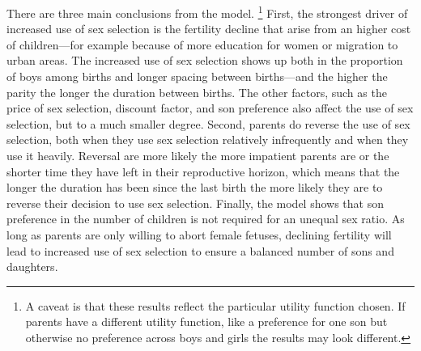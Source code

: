 \documentclass[12pt,letterpaper]{article}
\begin{document}



There are three main conclusions from the model.%
\footnote{
A caveat is that these results reflect the particular utility 
function chosen.
If parents have a different utility function, like a preference
for one son but otherwise no preference across boys and girls
the results may look different.
}
First, the strongest driver of increased use of sex selection is 
the fertility decline that arise from an higher cost of 
children---for example because of more education for women or 
migration to urban areas.
The increased use of sex selection shows up both in the 
proportion of boys among births and longer spacing between 
births---and the higher the parity the longer the duration between 
births.
The other factors, such as the price of sex selection, 
discount factor, and son preference also affect the use
of sex selection, but to a much smaller degree.
Second, parents do reverse the use of sex selection, 
both when they use sex selection relatively infrequently and when 
they use it heavily.
Reversal are more likely the more impatient parents are or the
shorter time they have left in their reproductive horizon, which
means that the longer the duration has been since the last birth
the more likely they are to reverse their decision to use sex selection.
Finally, the model shows that son preference in the number of
children is not required for an unequal sex ratio.
As long as parents are only willing to abort female fetuses, declining
fertility will lead to increased use of sex selection to ensure 
a balanced number of sons and daughters.
\end{document}

